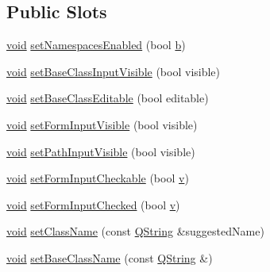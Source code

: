 \subsection*{Public Slots}
\begin{DoxyCompactItemize}
\item 
\hyperlink{group___u_a_v_objects_plugin_ga444cf2ff3f0ecbe028adce838d373f5c}{void} \hyperlink{class_utils_1_1_new_class_widget_a5c89fb1e9a2f9e8816579e26d01b5bc2}{set\-Namespaces\-Enabled} (bool \hyperlink{glext_8h_a6eba317e3cf44d6d26c04a5a8f197dcb}{b})
\item 
\hyperlink{group___u_a_v_objects_plugin_ga444cf2ff3f0ecbe028adce838d373f5c}{void} \hyperlink{class_utils_1_1_new_class_widget_aaaf28bf82d98ad50f6232ee76fbaa285}{set\-Base\-Class\-Input\-Visible} (bool visible)
\item 
\hyperlink{group___u_a_v_objects_plugin_ga444cf2ff3f0ecbe028adce838d373f5c}{void} \hyperlink{class_utils_1_1_new_class_widget_ac2276990adb49b7b81eb2d22a202b246}{set\-Base\-Class\-Editable} (bool editable)
\item 
\hyperlink{group___u_a_v_objects_plugin_ga444cf2ff3f0ecbe028adce838d373f5c}{void} \hyperlink{class_utils_1_1_new_class_widget_aef1b140a9e382e7e540a8572e3699bef}{set\-Form\-Input\-Visible} (bool visible)
\item 
\hyperlink{group___u_a_v_objects_plugin_ga444cf2ff3f0ecbe028adce838d373f5c}{void} \hyperlink{class_utils_1_1_new_class_widget_a074da3c815cded546c6725519d60d710}{set\-Path\-Input\-Visible} (bool visible)
\item 
\hyperlink{group___u_a_v_objects_plugin_ga444cf2ff3f0ecbe028adce838d373f5c}{void} \hyperlink{class_utils_1_1_new_class_widget_a5b42419017941a3fb8927c408ac899da}{set\-Form\-Input\-Checkable} (bool \hyperlink{glext_8h_a14cfbe2fc2234f5504618905b69d1e06}{v})
\item 
\hyperlink{group___u_a_v_objects_plugin_ga444cf2ff3f0ecbe028adce838d373f5c}{void} \hyperlink{class_utils_1_1_new_class_widget_af61268ef168692b168778e9b5dc44220}{set\-Form\-Input\-Checked} (bool \hyperlink{glext_8h_a14cfbe2fc2234f5504618905b69d1e06}{v})
\item 
\hyperlink{group___u_a_v_objects_plugin_ga444cf2ff3f0ecbe028adce838d373f5c}{void} \hyperlink{class_utils_1_1_new_class_widget_ac83a1c443d3c883fd63cb8869617b6bc}{set\-Class\-Name} (const \hyperlink{group___u_a_v_objects_plugin_gab9d252f49c333c94a72f97ce3105a32d}{Q\-String} \&suggested\-Name)
\item 
\hyperlink{group___u_a_v_objects_plugin_ga444cf2ff3f0ecbe028adce838d373f5c}{void} \hyperlink{class_utils_1_1_new_class_widget_a5daea6c14d2e6da5ba171622ec69718d}{set\-Base\-Class\-Name} (const \hyperlink{group___u_a_v_objects_plugin_gab9d252f49c333c94a72f97ce3105a32d}{Q\-String} \&)

\end{DoxyCompactItemize}

